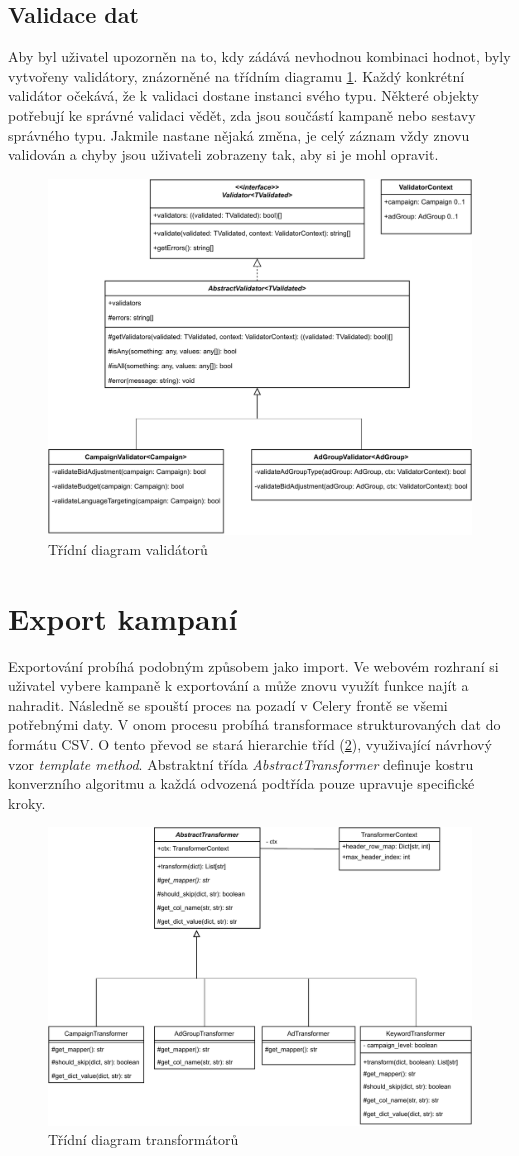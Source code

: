 \subsection{Validace dat}
Aby byl uživatel upozorněn na to, kdy zádává nevhodnou kombinaci hodnot, byly vytvořeny validátory, znázorněné na třídním diagramu \ref{fig:validators}. Každý konkrétní validátor
očekává, že k validaci dostane instanci svého typu. Některé objekty potřebují ke správné validaci vědět, zda jsou součástí kampaně nebo sestavy správného typu.
Jakmile nastane nějaká změna, je celý záznam vždy znovu validován a chyby jsou uživateli zobrazeny tak, aby si je mohl opravit.

\begin{figure}[h]
    \centering
    \includegraphics[width=.8\textwidth]{Figures/Validators.pdf}
    \caption{Třídní diagram validátorů}
    \label{fig:validators}
\end{figure}

\section{Export kampaní}
Exportování probíhá podobným způsobem jako import. Ve webovém rozhraní si uživatel vybere kampaně k exportování a může znovu využít funkce najít a nahradit.
Následně se spouští proces na pozadí v Celery frontě se všemi potřebnými daty. V onom procesu probíhá transformace strukturovaných dat do
formátu CSV. O tento převod se stará hierarchie tříd (\ref{fig:transformers}), využivající návrhový vzor \emph{template method}.
Abstraktní třída \emph{AbstractTransformer} definuje kostru konverzního algoritmu a každá odvozená podtřída pouze upravuje specifické
kroky. 

\begin{figure}[h]
    \centering
    \includegraphics[width=.8\textwidth]{Figures/Transformers.pdf}
    \caption{Třídní diagram transformátorů}
    \label{fig:transformers}
\end{figure}


\endinput